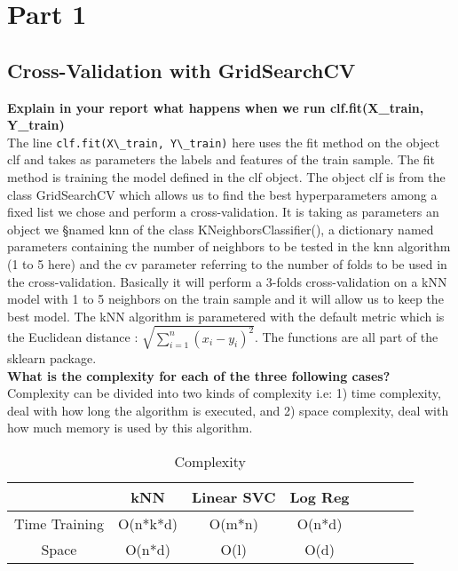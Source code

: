 \section{Part 1}

\subsection{Cross-Validation with GridSearchCV}
\textbf{Explain in your report what happens when we run clf.fit(X\_train, Y\_train)} \\

The line \verb|clf.fit(X\_train, Y\_train)| here uses the fit method on the object  clf and takes as parameters the labels and features of the train sample. The fit method is training the model defined in the clf object. The object clf is from the class GridSearchCV which allows us to find the best hyperparameters among a fixed list we chose and perform a cross-validation. It is taking as parameters an object we §named knn of the class KNeighborsClassifier(), a dictionary named parameters containing the number of neighbors to be tested in the knn algorithm (1 to 5 here) and the cv parameter referring to the number of folds to be used in the cross-validation. Basically it will perform a 3-folds cross-validation on a kNN model with 1 to 5 neighbors on the train sample and it will allow us to keep the best model. The kNN algorithm is parametered with the default metric which is the Euclidean distance : $\sqrt{\sum^n_{i=1}(x_i - y_i)^2}$. The functions are all part of the sklearn package. \\

 \textbf{What is the complexity for each of the three following cases?} \\

Complexity can be divided into two kinds of complexity i.e: 1) time complexity, deal with how long the algorithm is executed, and 2) space complexity, deal with how much memory is used by this algorithm.
\begin{table}[ht]
		\caption{Complexity}
		\vspace{0.5cm}
		\centering
		\begin{tabular}{|c|c|c|c|c|c|c|c|}
			\hline
			& kNN & Linear SVC & Log Reg   \\  [0.3ex]
			\hline 
			Time Training    & O(n*k*d)       &  O(m*n)     & O(n*d)        \\ 
			\hline 
			Space  &  O(n*d)      &  O(l)     &  O(d)      \\ 
			\hline 
		\end{tabular} 
        \label{table:nonlin}
	\end{table}	

